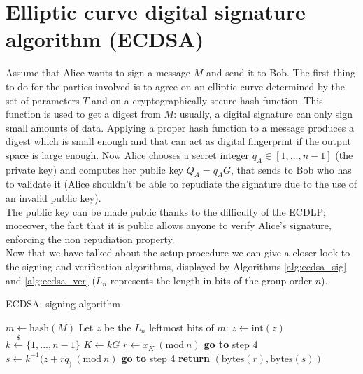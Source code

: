 \bigskip

\section{Elliptic curve digital signature algorithm (ECDSA)}
\label{ecdsa}
Assume that Alice wants to sign a message $M$ and send it to Bob. The first thing to do for the parties involved is to agree on an elliptic curve determined by the set of parameters $T$ and on a cryptographically secure hash function. This function is used to get a digest from $M$: usually, a digital signature can only sign small amounts of data. Applying a proper hash function to a message produces a digest which is small enough and that can act as digital fingerprint if the output space is large enough. Now Alice chooses a secret integer $q_A \in [1, ..., n - 1]$ (the private key) and computes her public key $Q_A = q_AG$, that sends to Bob who has to validate it (Alice shouldn't be able to repudiate the signature due to the use of an invalid public key). 
\\
The public key can be made public thanks to the difficulty of the ECDLP; moreover, the fact that it is public allows anyone to verify Alice's signature, enforcing the non repudiation property.
\\
Now that we have talked about the setup procedure we can give a closer look to the signing and verification algorithms, displayed by Algorithms \ref{alg:ecdsa_sig} and \ref{alg:ecdsa_ver} ($L_n$ represents the length in bits of the group order $n$).

\bigskip

\begin{algorithm}
	\caption{ECDSA: signing algorithm}
	\label{alg:ecdsa_sig}
	\begin{algorithmic}[1]
		\State $m \gets \text{hash}(M)$
		\State Let $z$ be the $L_n$ leftmost bits of $m$: $z \gets \text{int}(z)$
		\State $k \xleftarrow{\text{\$}} \{1, ..., n - 1\}$
		\State $K \gets kG$
		\State $r \gets x_K \ (\text{mod} \ n)$
		\State \textbf{go to} step 4
		\EndIf 
		\State $s \gets k^{-1}(z + rq_) \ (\text{mod} \ n)$
		\State \textbf{go to} step 4
		\EndIf
		\State \textbf{return} $(\text{bytes}(r), \text{bytes}(s))$
		\EndProcedure
	\end{algorithmic}
\end{algorithm}

\bigskip

